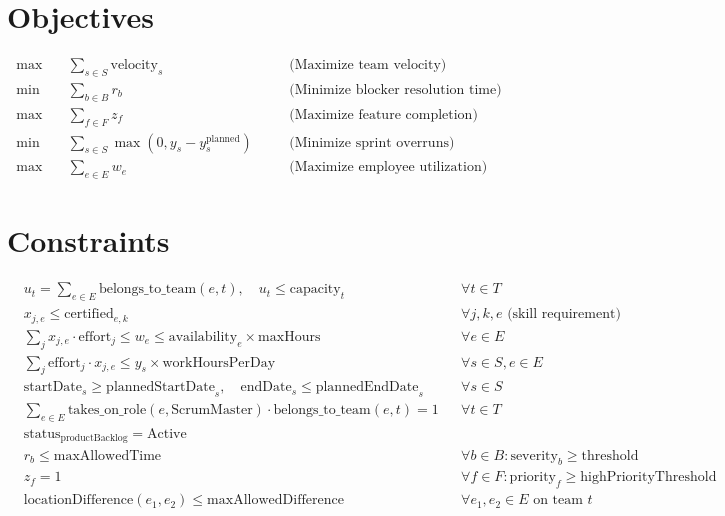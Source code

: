 \documentclass{article}
\begin{document}
\section*{Objectives}
\begin{align*}
\max \quad & \sum_{s \in S} \text{velocity}_s \quad && \text{(Maximize team velocity)} \\
\min \quad & \sum_{b \in B} r_b \quad && \text{(Minimize blocker resolution time)} \\
\max \quad & \sum_{f \in F} z_f \quad && \text{(Maximize feature completion)} \\
\min \quad & \sum_{s \in S} \max(0, y_s - y_s^{\text{planned}}) \quad && \text{(Minimize sprint overruns)} \\
\max \quad & \sum_{e \in E} w_e \quad && \text{(Maximize employee utilization)}
\end{align*}

\section*{Constraints}
\begin{align*}
& u_t = \sum_{e \in E} \text{belongs\_to\_team}(e,t), \quad u_t \leq \text{capacity}_t && \forall t \in T \\
& x_{j,e} \leq \text{certified}_{e,k} && \forall j,k,e \text{ (skill requirement)} \\
& \sum_j x_{j,e} \cdot \text{effort}_j \leq w_e \leq \text{availability}_e \times \text{maxHours} && \forall e \in E \\
& \sum_j \text{effort}_j \cdot x_{j,e} \leq y_s \times \text{workHoursPerDay} && \forall s \in S, e \in E \\
& \text{startDate}_s \geq \text{plannedStartDate}_s, \quad \text{endDate}_s \leq \text{plannedEndDate}_s && \forall s \in S \\
& \sum_{e \in E} \text{takes\_on\_role}(e, \text{ScrumMaster}) \cdot \text{belongs\_to\_team}(e,t) = 1 && \forall t \in T \\
& \text{status}_{\text{productBacklog}} = \text{Active} && \\
& r_b \leq \text{maxAllowedTime} && \forall b \in B: \text{severity}_b \geq \text{threshold} \\
& z_f = 1 && \forall f \in F: \text{priority}_f \geq \text{highPriorityThreshold} \\
& \text{locationDifference}(e_1, e_2) \leq \text{maxAllowedDifference} && \forall e_1, e_2 \in E \text{ on team } t
\end{align*}
\end{document}
